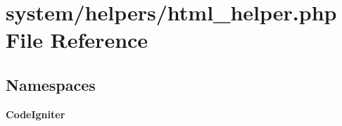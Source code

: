 \section{system/helpers/html\-\_\-helper.php File Reference}
\label{html__helper_8php}
\subsection*{Namespaces}
\begin{DoxyCompactItemize}
\item 
{\bf Code\-Igniter}
\end{DoxyCompactItemize}
